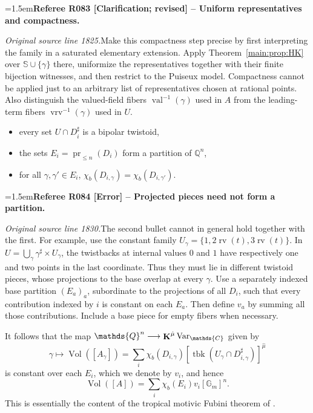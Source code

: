 \documentclass[12pt]{amsart}
\newcommand{\RefereeRemark}[4]{%
  \par\medskip\begingroup\normalfont\small\color{RefereePurple}%
  \emergencystretch=1.5em\noindent\textbf{Referee R#1 [#2] -- #3.}\par\nobreak\noindent #4\par
  \endgroup\medskip
}
\theoremstyle{plain}
\theoremstyle{definition}
\theoremstyle{remark}
\numberwithin{equation}{section}
\theoremstyle{plain}
\DeclareMathOperator{\pr}{pr}
\newcommand{\C}{\mathds{C}}
\newcommand{\G}{\mathds{G}}
\newcommand{\Q}{\mathds{Q}}
\newcommand{\0}{\emptyset}
\newcommand{\fun}{\longrightarrow}
\newcommand{\efun}{\longmapsto}
\DeclareMathOperator{\rv}{rv}
\DeclareMathOperator{\vv}{val}
\DeclareMathOperator{\ggk}{\mathbf{K}}
\DeclareMathOperator{\vrv}{vrv}
\newcommand{\var}{\textup{Var}}
\DeclareMathOperator{\Vol}{Vol}
\DeclareMathOperator{\tbk}{tbk}
\begin{document}
\RefereeRemark{083}{Clarification; revised}{Uniform representatives and compactness}{%
\textit{Original source line 1825.}\quad Make this compactness step precise by first interpreting the family in a saturated elementary extension. Apply Theorem~\ref{main:prop:HK} over $\mathbb S\cup\{\gamma\}$ there, uniformize the representatives together with their finite bijection witnesses, and then restrict to the Puiseux model. Compactness cannot be applied just to an arbitrary list of representatives chosen at rational points. Also distinguish the valued-field fibers $\vv^{-1}(\gamma)$ used in $A$ from the leading-term fibers $\vrv^{-1}(\gamma)$ used in $U$.
}
\begin{itemize}
  \item every set $U \cap D_{i}^\sharp$ is a bipolar twistoid,
  \item the sets $E_i = \pr_{\leq n}(D_i)$ form a partition of $\Q^n$,
  \item for all $\gamma, \gamma' \in E_i$, $\chi_b(D_{i,\gamma}) = \chi_b(D_{i,\gamma'})$.
\end{itemize}

\RefereeRemark{084}{Error}{Projected pieces need not form a partition}{%
\textit{Original source line 1830.}\quad The second bullet cannot in general hold together with the first. For example, use the constant family $U_\gamma=\{1,2\rv(t),3\rv(t)\}$. In $U=\bigcup_\gamma\gamma^\sharp\times U_\gamma$, the twistbacks at internal values $0$ and $1$ have respectively one and two points in the last coordinate. Thus they must lie in different twistoid pieces, whose projections to the base overlap at every $\gamma$. Use a separately indexed base partition $(E_a)_a$, subordinate to the projections of all $D_i$, such that every contribution indexed by $i$ is constant on each $E_a$. Then define $v_a$ by summing all those contributions. Include a base piece for empty fibers when necessary.
}
It follows  that the map $\Q^n \fun \ggk^{\hat \mu} \var_{\C}$ given by
\begin{equation}\label{trop:fub:cons}
\gamma \efun \Vol([A_\gamma]) = \sum_{i} \chi_b(D_{i,\gamma}) [\tbk (U_\gamma \cap D^\sharp_{i,\gamma})]^{\hat \mu}
\end{equation}
is constant over each $E_i$, which we denote by $v_i$, and hence
\[
 \Vol([A]) = \sum_i \chi_b(E_i)v_i[\G_m]^{n}.
\]
This  is essentially the content of the tropical motivic Fubini theorem  of \cite{Nic:Pay:trop:fub}.
\end{document}
